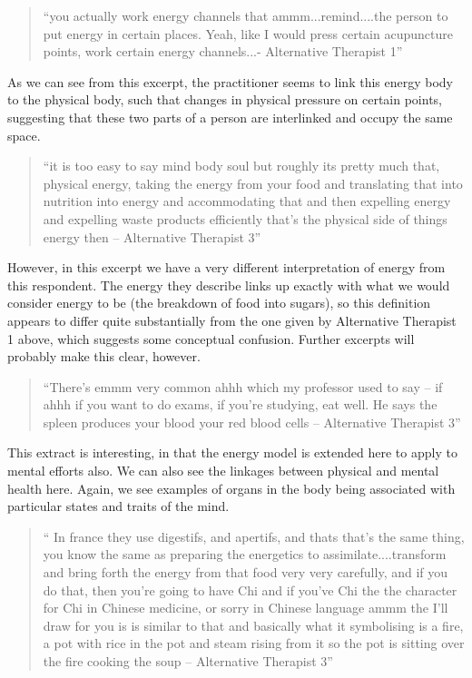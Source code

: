 \begin{quotation}
``you actually work energy channels that ammm...remind....the person to put energy in certain places. Yeah, like I would press certain acupuncture points, work certain energy channels...- Alternative Therapist 1''  
\end{quotation}


As we can see from this excerpt, the practitioner seems to link this energy body to the physical body, such that changes in physical pressure on certain points, suggesting that these two parts of a person are interlinked and occupy the same space. 
\begin{quotation}
``it is too easy to say mind body soul but roughly its pretty much that, physical energy, taking the energy from your food and translating that into nutrition into energy and accommodating that and then expelling energy and expelling waste products efficiently that's the physical side of things energy then – Alternative Therapist 3''  
\end{quotation}


However, in this excerpt we have a very different interpretation of energy from this respondent. The energy they describe links up exactly with what we would consider energy to be (the breakdown of food into sugars), so this definition appears to differ quite substantially from the one given by Alternative Therapist 1 above, which suggests some conceptual confusion. Further excerpts will probably make this clear, however. 

\begin{quotation}
``There's emmm very common ahhh which my professor used to say – if ahhh if you want to do exams, if you're studying, eat well. He says the spleen produces your blood your red blood cells – Alternative Therapist 3''  
\end{quotation}


This extract is interesting, in that the energy model is extended here to apply to mental efforts also. We can also see the linkages between physical and mental health here. Again, we see examples of organs in the body being associated with particular states and traits of the mind. 

\begin{quotation}
`` In france they use digestifs, and apertifs, and thats that's the same thing, you know the same as preparing the energetics to assimilate....transform and bring forth the energy from that food very very carefully, and if you do that, then you're going to have Chi and if you've Chi the the character for Chi in Chinese medicine, or sorry in Chinese language ammm the I'll draw for you is is similar to that and basically what it symbolising is a fire, a pot with rice in the pot and steam rising from it so the pot is sitting over the fire cooking the soup – Alternative Therapist 3''  
\end{quotation}


